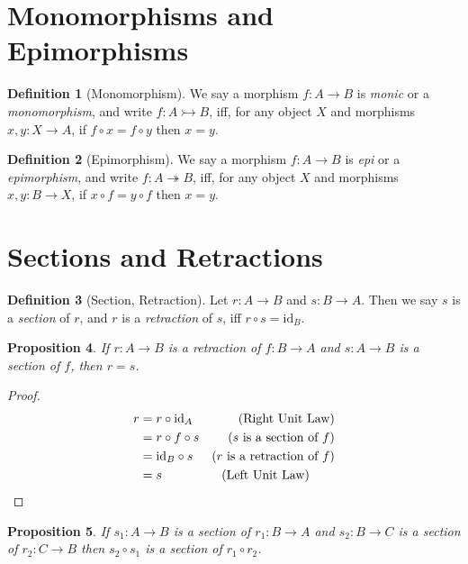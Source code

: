 \documentclass{book}
\let\qed\relax
\newtheorem{prop}{Proposition}[chapter]
\theoremstyle{definition}
\newtheorem{df}[prop]{Definition}
\newcommand{\id}[1]{\ensuremath{\mathrm{id}_{#1}}}
\begin{document}
\section{Monomorphisms and Epimorphisms}

\begin{df}[Monomorphism]
We say a morphism $f : A \rightarrow B$ is \emph{monic} or a \emph{monomorphism}, and write $f : A \rightarrowtail B$, iff, for any object $X$ and morphisms $x,y : X \rightarrow A$, if $f \circ x = f \circ y$ then $x = y$.
\end{df}

\begin{df}[Epimorphism]
We say a morphism $f : A \rightarrow B$ is \emph{epi} or a \emph{epimorphism}, and write $f : A \twoheadrightarrow B$, iff, for any object $X$ and morphisms $x,y : B \rightarrow X$, if $x \circ f = y \circ f$ then $x = y$.
\end{df}

\section{Sections and Retractions}

\begin{df}[Section, Retraction]
Let $r : A \rightarrow B$ and $s : B \rightarrow A$. Then we say $s$ is a \emph{section} of $r$, and $r$ is a \emph{retraction} of $s$, iff $r \circ s = \id{B}$.
\end{df}

\begin{prop}
\label{prop:retraction_is_section}
If $r : A \rightarrow B$ is a retraction of $f : B \rightarrow A$ and $s : A \rightarrow B$ is a section of $f$, then $r = s$.
\end{prop}

\begin{proof}
\pf
\begin{align*}
	r & = r \circ \id{A} & (\text{Right Unit Law}) \\
	& = r \circ f \circ s & (\text{$s$ is a section of $f$}) \\
	& = \id{B} \circ s & (\text{$r$ is a retraction of $f$}) \\
	& = s & (\text{Left Unit Law}) \qquad \qed
\end{align*}
\end{proof}

\begin{prop}
\label{prop:section_comp}
If $s_1 : A \rightarrow B$ is a section of $r_1 : B \rightarrow A$ and $s_2 : B \rightarrow C$ is a section of $r_2 : C \rightarrow B$ then $s_2 \circ s_1$ is a section of $r_1 \circ r_2$.
\end{prop}
\end{document}
